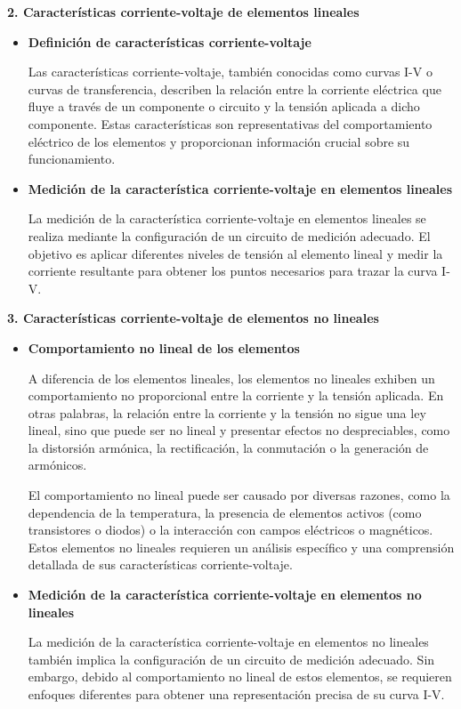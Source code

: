 \documentclass[12pt]{article}
\begin{document}
	\textbf{2. Características corriente-voltaje de elementos lineales}
	
	\begin{itemize}
		\item \textbf{Definición de características corriente-voltaje}
		
		Las características corriente-voltaje, también conocidas como curvas I-V o curvas de transferencia, describen la relación entre la corriente eléctrica que fluye a través de un componente o circuito y la tensión aplicada a dicho componente. Estas características son representativas del comportamiento eléctrico de los elementos y proporcionan información crucial sobre su funcionamiento.
		
		\item \textbf{Medición de la característica corriente-voltaje en elementos lineales}
		
		La medición de la característica corriente-voltaje en elementos lineales se realiza mediante la configuración de un circuito de medición adecuado. El objetivo es aplicar diferentes niveles de tensión al elemento lineal y medir la corriente resultante para obtener los puntos necesarios para trazar la curva I-V.
	\end{itemize}
	
	\textbf{3. Características corriente-voltaje de elementos no lineales}
	
	\begin{itemize}
		\item \textbf{Comportamiento no lineal de los elementos}
		
		A diferencia de los elementos lineales, los elementos no lineales exhiben un comportamiento no proporcional entre la corriente y la tensión aplicada. En otras palabras, la relación entre la corriente y la tensión no sigue una ley lineal, sino que puede ser no lineal y presentar efectos no despreciables, como la distorsión armónica, la rectificación, la conmutación o la generación de armónicos.
		
		El comportamiento no lineal puede ser causado por diversas razones, como la dependencia de la temperatura, la presencia de elementos activos (como transistores o diodos) o la interacción con campos eléctricos o magnéticos. Estos elementos no lineales requieren un análisis específico y una comprensión detallada de sus características corriente-voltaje.
		
		\item \textbf{Medición de la característica corriente-voltaje en elementos no lineales}
		
		La medición de la característica corriente-voltaje en elementos no lineales también implica la configuración de un circuito de medición adecuado. Sin embargo, debido al comportamiento no lineal de estos elementos, se requieren enfoques diferentes para obtener una representación precisa de su curva I-V.
	\end{itemize}
	
\end{document}
